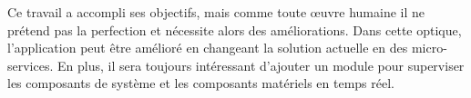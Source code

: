 Ce travail a accompli ses objectifs, mais comme toute œuvre humaine il ne prétend pas la perfection et nécessite alors des améliorations. Dans cette optique, l'application peut être amélioré en changeant la solution actuelle en des micro-services. En plus, il sera toujours intéressant d'ajouter un module pour superviser les composants de système et les composants matériels en temps réel.\\